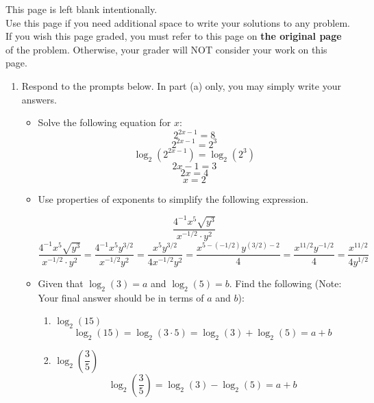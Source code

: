\documentclass[11pt]{article}
\begin{document}
\vfill


\newpage

This page is left blank intentionally.\\

Use this page if you need additional space to write your solutions to any problem. \\

If you wish this page graded, you must refer to this page on \textbf{the original page} of the problem. Otherwise, your grader will NOT consider your work on this page.

\newpage%


\begin{enumerate}


\item Respond to the prompts below. In part (a) only, you may simply write your answers.
\begin{itemize}
\item[(a)] Solve the following equation for $x$:
$$2^{2x - 1} = 8$$
{\color{blue}
\[2^{2x-1}=2^3\]
\[\log_2(2^{2x-1})=\log_2(2^3)\]
\[2x-1=3\]
\[2x=4\]
\[x=2\]
}
\item[(b)] Use properties of exponents to simplify the following expression. 

\[
\frac{4^{-1}x^5\sqrt{y^3}}{x^{-1/2} \cdot y^2}
\]
{\color{blue}
\[
\frac{4^{-1}x^5\sqrt{y^3}}{x^{-1/2} \cdot y^2}=\frac{4^{-1}x^5y^{3/2}}{x^{-1/2}y^2}=\frac{x^5y^{3/2}}{4x^{-1/2}y^2}=\frac{x^{5-(-1/2)}y^{(3/2)-2}}{4}=\frac{x^{11/2}y^{-1/2}}{4}=\frac{x^{11/2}}{4y^{1/2}}
\]
}
\item[(c)] Given that $\log_2(3) = a$ and $\log_2(5) = b.$ Find the following (Note: Your final answer should be in terms of $a$ and $b$):
\begin{enumerate}
\item $\log_2(15)$\\
{\color{blue}\[\log_2(15)=\log_2(3\cdot5)=\log_2(3)+\log_2(5)=a+b\]}
\vspace{4cm}

\item $\log_2\left(\dfrac{3}{5}\right)$\\
{\color{blue}\[\log_2\left(\frac{3}{5}\right)=\log_2(3)-\log_2(5)=a+b\]}
\end{enumerate}

\end{itemize}



\end{enumerate}
\end{document}
